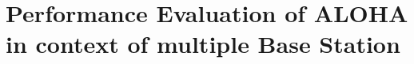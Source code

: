 \chapter{Performance Evaluation of ALOHA in context of multiple Base Station}
\label{chapter:ieee-cl-17}

\ifpdf
    \graphicspath{{Chapter5/Figs/Raster/}{Chapter5/Figures/PDF/}{Chapter5/Figures/}}
\else
    \graphicspath{{Chapter5/Figs/Vector/}{Chapter5/Figures/}}
\fi












